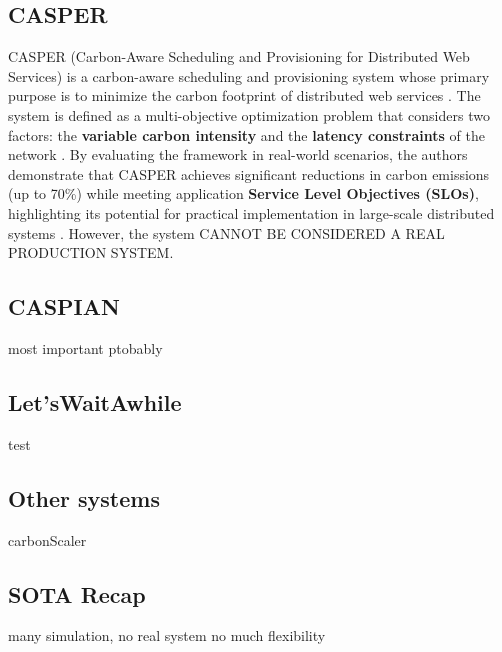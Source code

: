 \subsection{CASPER}

CASPER (Carbon-Aware Scheduling and Provisioning for Distributed Web Services) is a carbon-aware scheduling and provisioning system whose primary purpose is to minimize the carbon footprint of distributed web services \cite{Souza_2023}.
The system is defined as a multi-objective optimization problem that considers two factors: the \textbf{variable carbon intensity} and the \textbf{latency constraints} of the network \cite{Souza_2023}.
By evaluating the framework in real-world scenarios, the authors demonstrate that CASPER achieves significant reductions in carbon emissions (up to 70\%) while meeting application \textbf{Service Level Objectives (SLOs)}, highlighting its potential for practical implementation in large-scale distributed systems \cite{Souza_2023}. However, the system CANNOT BE CONSIDERED A REAL PRODUCTION SYSTEM.




\subsection{CASPIAN}

most important ptobably

\subsection{Let'sWaitAwhile}

test

\subsection{Other systems}

carbonScaler




\subsection{SOTA Recap}

many simulation, no real system
no much flexibility


\newpage
